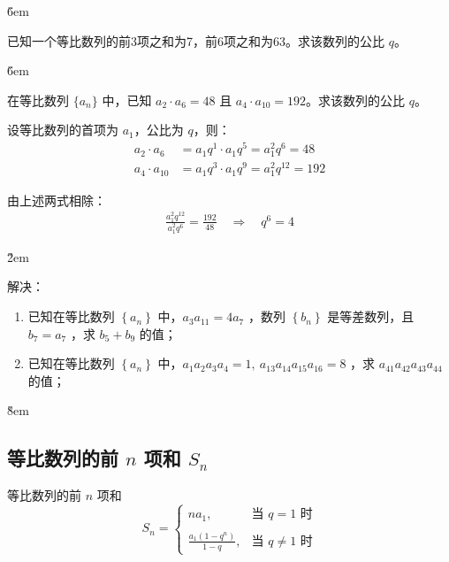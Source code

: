 \v{6em}

\begin{example}
    已知一个等比数列的前3项之和为7，前6项之和为63。求该数列的公比 $q$。
\end{example}

\v{6em}

\begin{example}
    在等比数列 $\{a_n\}$ 中，已知 $a_2 \cdot a_6 = 48$ 且 $a_4 \cdot a_{10} = 192$。求该数列的公比 $q$。
\end{example}

\begin{solution}
    设等比数列的首项为 $a_1$，公比为 $q$，则：
    \begin{align}
        a_2 \cdot a_6    & = a_1q^1 \cdot a_1q^5 = a_1^2q^6 = 48     \\
        a_4 \cdot a_{10} & = a_1q^3 \cdot a_1q^9 = a_1^2q^{12} = 192
    \end{align}

    由上述两式相除：
    \begin{align}
        \frac{a_1^2q^{12}}{a_1^2q^6} = \frac{192}{48} \quad \Rightarrow \quad q^6 = 4
    \end{align}
\end{solution}

\v{2em}

\begin{example}
    解决：
    \begin{enumerate}
        \item 已知在等比数列 $\left\{a_n\right\}$ 中，$a_3 a_{11}=4 a_7$ ，数列 $\left\{b_n\right\}$ 是等差数列，且 $b_7=a_7$ ，求 $b_5+b_9$ 的值；

        \item 已知在等比数列 $\left\{a_n\right\}$ 中，$a_1 a_2 a_3 a_4=1, ~ a_{13} a_{14} a_{15} a_{16}=8$ ，求 $a_{41} a_{42} a_{43} a_{44}$ 的值；
    \end{enumerate}
\end{example}

\v{8em}

\subsection{等比数列的前 $n$ 项和 $S_n$}

\begin{definition}
    等比数列的前 $n$ 项和
    $$
        S_n =
        \begin{cases}
            na_1,                   & \text{当 } q=1 \text{ 时}      \\
            \\
            \frac{a_1(1-q^n)}{1-q}, & \text{当 } q \neq 1 \text{ 时}
        \end{cases}
    $$
\end{definition}

